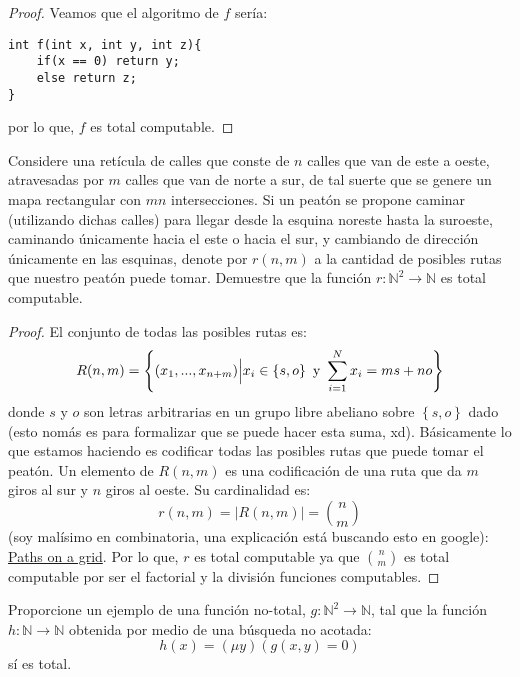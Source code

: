 \documentclass[12pt]{report}
\newcounter{it}
\theoremstyle{largebreak}
\newcommand\abs[1]{\ensuremath{\left|#1\right|}}
\newcommand\cf[3]{\ensuremath{#1:#2\rightarrow#3}}
\begin{document}
    \begin{proof}
        Veamos que el algoritmo de $f$ sería:
        \begin{lstlisting}
int f(int x, int y, int z){
    if(x == 0) return y;
    else return z;
}
        \end{lstlisting}
        por lo que, $f$ es total computable.
    \end{proof}

    \begin{excer}
        Considere una retícula de calles que conste de $n$ calles que van de este a oeste, atravesadas por $m$ calles que van de norte a sur, de tal suerte que se genere un mapa rectangular con $mn$ intersecciones. Si un peatón se propone caminar (utilizando dichas calles) para llegar desde la esquina noreste hasta la suroeste, caminando únicamente hacia el este o hacia el sur, y cambiando de dirección únicamente en las esquinas, denote por $r(n,m)$ a la cantidad de posibles rutas que nuestro peatón puede tomar. Demuestre que la función $\cf{r}{\mathbb{N}^2}{\mathbb{N}}$ es total computable.
    \end{excer}

    \begin{proof}
        El conjunto de todas las posibles rutas es:
        \begin{equation*}
            R(n,m)=\left\{(x_1,...,x_{n+m})\Big|x_i\in\left\{s,o\right\}\textup{ y }\sum_{ i=1}^Nx_i = ms+no  \right\}
        \end{equation*}
        donde $s$ y $o$ son letras arbitrarias en un grupo libre abeliano sobre $\left\{s,o\right\}$ dado (esto nomás es para formalizar que se puede hacer esta suma, xd). Básicamente lo que estamos haciendo es codificar todas las posibles rutas que puede tomar el peatón. Un elemento de $R(n,m)$ es una codificación de una ruta que da $m$ giros al sur y $n$ giros al oeste. Su cardinalidad es:
        \begin{equation*}
            r(n,m)=\abs{R(n,m)}=\binom{n}{m}
        \end{equation*}
        (soy malísimo en combinatoria, una explicación está buscando esto en google): \href{https://polypad.amplify.com/es/lesson/paths-on-a-grid}{Paths on a grid}. Por lo que, $r$ es total computable ya que $\binom{n}{m}$ es total computable por ser el factorial y la división funciones computables.
    \end{proof}

    \begin{excer}
        Proporcione un ejemplo de una función no-total, $\cf{g}{\mathbb{N}^2}{\mathbb{N}}$, tal que la función $\cf{h}{\mathbb{N}}{\mathbb{N}}$ obtenida por medio de una búsqueda no acotada:
        \begin{equation*}
            h(x)=(\mu y)(g(x,y)=0)
        \end{equation*}
        sí es total.
    \end{excer}
\end{document}
